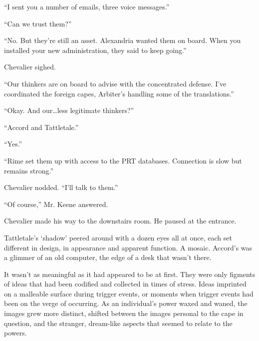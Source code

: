 ``I sent you a number of emails, three voice messages.''



``Can we trust them?''



``No.  But they're still an asset.  Alexandria wanted them on board.  When you installed your new administration, they said to keep going.''



Chevalier sighed.



``Our thinkers are on board to advise with the concentrated defense.  I've coordinated the foreign capes, Arbiter's handling some of the translations.''



``Okay.  And our\ldots less legitimate thinkers?''



``Accord and Tattletale.''



``Yes.''



``Rime set them up with access to the PRT databases.  Connection is slow but remains strong.''



Chevalier nodded.  ``I'll talk to them.''



``Of course,'' Mr. Keene answered.



Chevalier made his way to the downstairs room.  He paused at the entrance.



Tattletale's `shadow' peered around with a dozen eyes all at once, each set different in design, in appearance and apparent function.  A mosaic.  Accord's was a glimmer of an old computer, the edge of a desk that wasn't there.



It wasn't as meaningful as it had appeared to be at first.  They were only figments of ideas that had been codified and collected in times of stress.  Ideas imprinted on a malleable surface during trigger events, or moments when trigger events had been on the verge of occurring.  As an individual's power waxed and waned, the images grew more distinct, shifted between the images personal to the cape in question, and the stranger, dream-like aspects that seemed to relate to the powers.




